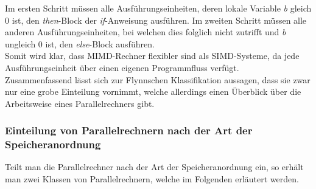				
				
				Im ersten Schritt müssen alle Ausführungseinheiten, deren lokale Variable \textit{b} gleich 0 ist, den \textit{then}-Block der \textit{if}-Anweisung ausführen. Im zweiten Schritt müssen alle anderen Ausführungseinheiten, bei welchen dies folglich nicht zutrifft und \textit{b} ungleich 0 ist, den \textit{else}-Block ausführen.\\
				Somit wird klar, dass MIMD-Rechner flexibler sind als SIMD-Systeme, da jede Ausführungseinheit über einen eigenen Programmfluss verfügt.\\
				Zusammenfassend lässt sich zur Flynnschen Klassifikation aussagen, dass sie zwar nur eine grobe Einteilung vornimmt, welche allerdings einen Überblick über die Arbeitsweise eines Parallelrechners gibt. \cite{ParaProgRauber}
		
			\subsubsection{Einteilung von Parallelrechnern nach der Art der Speicheranordnung}
			
				Teilt man die Parallelrechner nach der Art der Speicheranordnung ein, so erhält man zwei Klassen von Parallelrechnern, welche im Folgenden erläutert werden.
				
